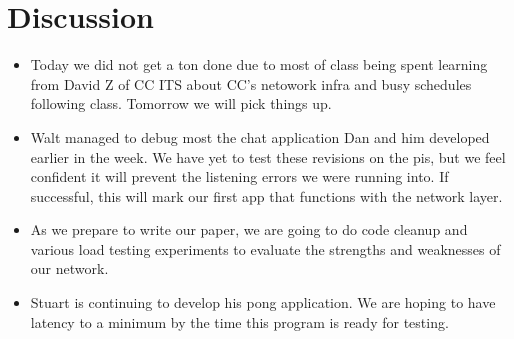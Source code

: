 \documentclass{article}
\begin{document}
\section*{Discussion}
\begin{itemize}
    \item Today we did not get a ton done due to most of class being spent learning from David Z of CC ITS about CC's netowork infra and busy schedules
    following class. Tomorrow we will pick things up.
    \item Walt managed to debug most the chat application Dan and him developed earlier in the week. We have yet to test these revisions on the pis, but we
    feel confident it will prevent the listening errors we were running into. If successful, this will mark our first app that functions with the network layer.
    \item As we prepare to write our paper, we are going to do code cleanup and various load testing experiments to evaluate the strengths and weaknesses of
    our network.
    \item Stuart is continuing to develop his pong application. We are hoping to have latency to a minimum by the time this program is ready for testing.
\end{itemize}

\end{document}
